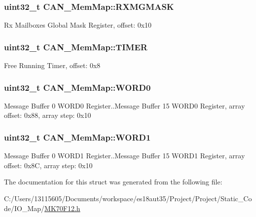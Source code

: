 \subsubsection[{R\+X\+M\+G\+M\+A\+S\+K}]{\setlength{\rightskip}{0pt plus 5cm}uint32\+\_\+t C\+A\+N\+\_\+\+Mem\+Map\+::\+R\+X\+M\+G\+M\+A\+S\+K}\label{struct_c_a_n___mem_map_aa788d49d34c42aeb411ed6b43f1a7c42}
Rx Mailboxes Global Mask Register, offset\+: 0x10 \hypertarget{struct_c_a_n___mem_map_a7cdd012a6030c4bf528cec65fddb71ca}{}
\subsubsection[{T\+I\+M\+E\+R}]{\setlength{\rightskip}{0pt plus 5cm}uint32\+\_\+t C\+A\+N\+\_\+\+Mem\+Map\+::\+T\+I\+M\+E\+R}\label{struct_c_a_n___mem_map_a7cdd012a6030c4bf528cec65fddb71ca}
Free Running Timer, offset\+: 0x8 \hypertarget{struct_c_a_n___mem_map_ac2b68cfbc9aeab141d20ae8bd73cd169}{}
\subsubsection[{W\+O\+R\+D0}]{\setlength{\rightskip}{0pt plus 5cm}uint32\+\_\+t C\+A\+N\+\_\+\+Mem\+Map\+::\+W\+O\+R\+D0}\label{struct_c_a_n___mem_map_ac2b68cfbc9aeab141d20ae8bd73cd169}
Message Buffer 0 W\+O\+R\+D0 Register..Message Buffer 15 W\+O\+R\+D0 Register, array offset\+: 0x88, array step\+: 0x10 \hypertarget{struct_c_a_n___mem_map_ae9343e0c532c0f3784d9960ffb8aa229}{}
\subsubsection[{W\+O\+R\+D1}]{\setlength{\rightskip}{0pt plus 5cm}uint32\+\_\+t C\+A\+N\+\_\+\+Mem\+Map\+::\+W\+O\+R\+D1}\label{struct_c_a_n___mem_map_ae9343e0c532c0f3784d9960ffb8aa229}
Message Buffer 0 W\+O\+R\+D1 Register..Message Buffer 15 W\+O\+R\+D1 Register, array offset\+: 0x8\+C, array step\+: 0x10 

The documentation for this struct was generated from the following file\+:\begin{DoxyCompactItemize}
\item 
C\+:/\+Users/13115605/\+Documents/workspace/es18aut35/\+Project/\+Project/\+Static\+\_\+\+Code/\+I\+O\+\_\+\+Map/\hyperlink{_m_k70_f12_8h}{M\+K70\+F12.\+h}\end{DoxyCompactItemize}
